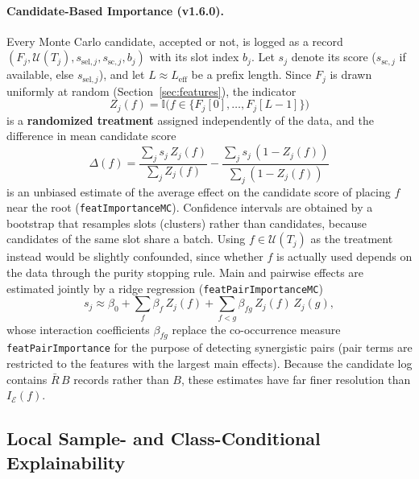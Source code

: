 \documentclass[11pt,a4paper]{article}
\newcommand{\code}[1]{\texttt{#1}}
\newcommand{\Ind}{\mathbb{I}}
\begin{document}
\paragraph{Candidate-Based Importance (v1.6.0).}
Every Monte Carlo candidate, accepted or not, is logged as a record $(F_j, \mathcal{U}(T_j), s_{\text{sel},j}, s_{\text{sc},j}, b_j)$ with its slot index $b_j$. Let $s_j$ denote its score ($s_{\text{sc},j}$ if available, else $s_{\text{sel},j}$), and let $L \approx L_{\text{eff}}$ be a prefix length. Since $F_j$ is drawn uniformly at random (Section~\ref{sec:features}), the indicator
\begin{equation}
  Z_j(f) = \Ind\big(f \in \{F_j[0], \dots, F_j[L-1]\}\big)
\end{equation}
is a \textbf{randomized treatment} assigned independently of the data, and the difference in mean candidate score
\begin{equation}
  \Delta(f) = \frac{\sum_j s_j\, Z_j(f)}{\sum_j Z_j(f)} - \frac{\sum_j s_j\,(1 - Z_j(f))}{\sum_j (1 - Z_j(f))}
\end{equation}
is an unbiased estimate of the average effect on the candidate score of placing $f$ near the root (\code{featImportanceMC}). Confidence intervals are obtained by a bootstrap that resamples slots (clusters) rather than candidates, because candidates of the same slot share a batch. Using $f \in \mathcal{U}(T_j)$ as the treatment instead would be slightly confounded, since whether $f$ is actually used depends on the data through the purity stopping rule. Main and pairwise effects are estimated jointly by a ridge regression (\code{featPairImportanceMC})
\begin{equation}
  s_j \approx \beta_0 + \sum_{f} \beta_f\, Z_j(f) + \sum_{f < g} \beta_{fg}\, Z_j(f)\, Z_j(g),
\end{equation}
whose interaction coefficients $\beta_{fg}$ replace the co-occurrence measure \code{featPairImportance} for the purpose of detecting synergistic pairs (pair terms are restricted to the features with the largest main effects). Because the candidate log contains $\bar{R}\,B$ records rather than $B$, these estimates have far finer resolution than $I_{\mathcal{E}}(f)$.

\subsection{Local Sample- and Class-Conditional Explainability}
\end{document}
